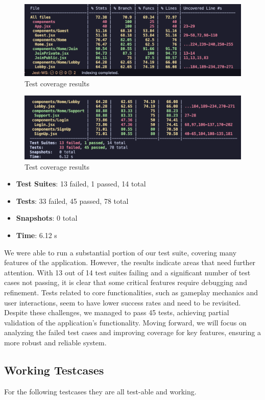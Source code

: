 \begin{figure}[H]
    \centering
    \includegraphics[width=0.8\linewidth]{branch1.png}
    \caption{Test coverage results}
    \label{fig:branch1}
\end{figure}

\begin{figure}[H]
    \centering
    \includegraphics[width=0.8\linewidth]{branch2.png}
    \caption{Test coverage results}
    \label{fig:branch2}
\end{figure}

\begin{itemize}
    \item \textbf{Test Suites}: 13 failed, 1 passed, 14 total
    \item \textbf{Tests}: 33 failed, 45 passed, 78 total
    \item \textbf{Snapshots}: 0 total
    \item \textbf{Time}: 6.12 s
\end{itemize}

We were able to run a substantial portion of our test suite, covering many features of the application. However, the results indicate areas that need further attention. With 13 out of 14 test suites failing and a significant number of test cases not passing, it is clear that some critical features require debugging and refinement. Tests related to core functionalities, such as gameplay mechanics and user interactions, seem to have lower success rates and need to be revisited. Despite these challenges, we managed to pass 45 tests, achieving partial validation of the application’s functionality. Moving forward, we will focus on analyzing the failed test cases and improving coverage for key features, ensuring a more robust and reliable system.


\subsection{Working Testcases}
For the following testcases they are all test-able and working.

